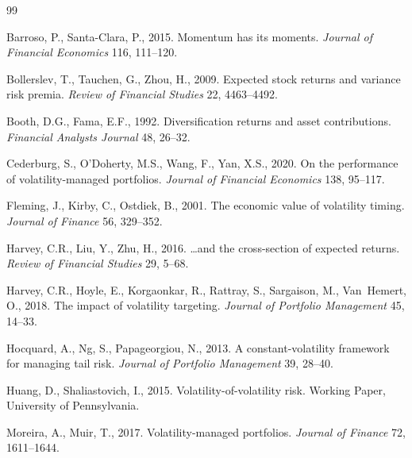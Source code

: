 \documentclass[12pt,a4paper]{article}
\begin{document}

\begin{thebibliography}{99}

Barroso, P., Santa-Clara, P., 2015. Momentum has its moments. \textit{Journal of Financial Economics} 116, 111--120.

Bollerslev, T., Tauchen, G., Zhou, H., 2009. Expected stock returns and variance risk premia. \textit{Review of Financial Studies} 22, 4463--4492.

Booth, D.G., Fama, E.F., 1992. Diversification returns and asset contributions. \textit{Financial Analysts Journal} 48, 26--32.

Cederburg, S., O'Doherty, M.S., Wang, F., Yan, X.S., 2020. On the performance of volatility-managed portfolios. \textit{Journal of Financial Economics} 138, 95--117.

Fleming, J., Kirby, C., Ostdiek, B., 2001. The economic value of volatility timing. \textit{Journal of Finance} 56, 329--352.

Harvey, C.R., Liu, Y., Zhu, H., 2016. \ldots and the cross-section of expected returns. \textit{Review of Financial Studies} 29, 5--68.

Harvey, C.R., Hoyle, E., Korgaonkar, R., Rattray, S., Sargaison, M., Van~Hemert, O., 2018. The impact of volatility targeting. \textit{Journal of Portfolio Management} 45, 14--33.

Hocquard, A., Ng, S., Papageorgiou, N., 2013. A constant-volatility framework for managing tail risk. \textit{Journal of Portfolio Management} 39, 28--40.

Huang, D., Shaliastovich, I., 2015. Volatility-of-volatility risk. Working Paper, University of Pennsylvania.

Moreira, A., Muir, T., 2017. Volatility-managed portfolios. \textit{Journal of Finance} 72, 1611--1644.

\end{thebibliography}
\end{document}

